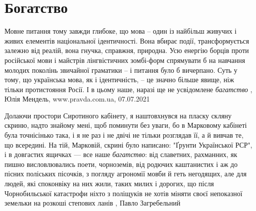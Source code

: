  
 
 
 
 
\chapter{Богатство}
\label{sec:slova.bogatstvo}

Мовне питання тому завжди глибоке, що мова – один із найбільш живучих і живих
елементів національної ідентичності. Вона вбирає події, трансформується залежно
від реалій, вона гнучка, справжня, природна. 
Усю енергію борців проти російської мови і майстрів лінгвістичних зомбі-форм
спрямувати б на навчання молодих поколінь звичайної граматики – і питання було
б вичерпано. Суть у тому, що українська мова, як і ідентичність, – це значно
більше явище, ніж тільки протистояння Росії. І в цьому наше, наразі ще не
усвідомлене \emph{багатство}
, 
Юлія Мендель, www.pravda.com.ua, 07.07.2021

Долаючи простори Сиротиного кабінету, я наштовхнувся на пласку скляну скриню,
надто знайому мені, щоб поминути без уваги, бо в Марковому кабінеті була
точнісінько така, і я не раз і не двічі не тільки розглядав її, а й вивчав те,
що всередині. На тій, Марковій, скрині було написано: "Ґрунти Української РСР",
і в довгастих ящичках — все наше \emph{багатство}: від славетних, рахманних, як пишно
висловлювались поети, чорноземів, від родючих каштанистих і аж до пісних
поліських пісочків, з погляду агрономії мовби й геть негодящих, але для людей,
які споконвіку на них жили, таких милих і дорогих, що після Чорнобильської
катастрофи ніхто з поліщуків не хотів міняти своєї непоказної земельки на
розкоші степових ланів
, Павло Загребельний 
